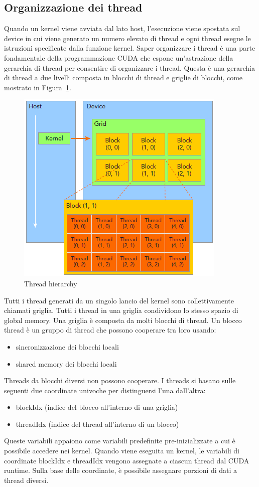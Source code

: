\subsection{Organizzazione dei thread}
Quando un kernel viene avviata dal lato host, l'esecuzione viene spostata sul device in cui viene generato un numero elevato di thread e ogni thread esegue le istruzioni specificate dalla funzione kernel. Saper organizzare i thread è una parte fondamentale della programmazione CUDA che espone un'astrazione della gerarchia di thread per consentire di organizzare i thread. Questa è una gerarchia di thread a due livelli composta in blocchi di thread e griglie di blocchi, come mostrato in Figura~\ref{fig:Thread_hierarchy}.
\begin{figure}[h!]
	\centering
	\includegraphics[width=.7\textwidth]{Immagini/CUDA/Thread_hierarchy}
	\caption{Thread hierarchy \cite{Cheng:ProfessionalCudaProgramming}}
	\label{fig:Thread_hierarchy}
\end{figure}
Tutti i thread generati da un singolo lancio del kernel sono collettivamente chiamati griglia. Tutti i thread in una griglia condividono lo stesso spazio di global memory. Una griglia è composta da molti blocchi di thread. Un blocco thread è un gruppo di thread che possono cooperare tra loro usando:
\begin{itemize}
	\item sincronizzazione dei blocchi locali
	\item shared memory dei blocchi locali
\end{itemize}
Threads da blocchi diversi non possono cooperare. I threads si basano sulle seguenti due coordinate univoche per distinguersi l'una dall'altra:
\begin{itemize}
	\item blockIdx (indice del blocco all'interno di una griglia)
	\item threadIdx (indice del thread all'interno di un blocco)
\end{itemize}
Queste variabili appaiono come variabili predefinite pre-inizializzate a cui è possibile accedere nei kernel. Quando viene eseguita un kernel, le variabili di coordinate blockIdx e threadIdx vengono assegnate a ciascun thread dal CUDA runtime. Sulla base delle coordinate, è possibile assegnare porzioni di dati a thread diversi.


